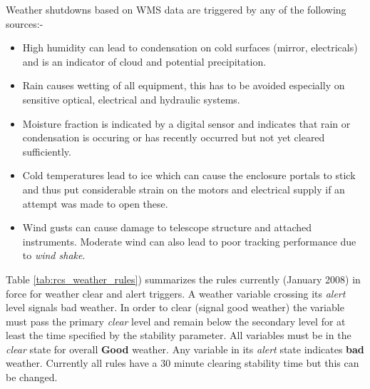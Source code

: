Weather shutdowns based on WMS data are triggered by any of the following sources:-
\begin{itemize}
\item High humidity can lead to condensation on cold surfaces (mirror, electricals) and is an indicator of cloud and potential precipitation.
\item Rain causes wetting of all equipment, this has to be avoided especially on sensitive optical, electrical and hydraulic systems.
\item Moisture fraction is indicated by a digital sensor and indicates that rain or condensation is occuring or has recently occurred but not yet cleared sufficiently.
\item Cold temperatures lead to ice which can cause the enclosure portals to stick and thus put considerable strain on the motors and electrical supply if an attempt was made to open these.
\item Wind gusts  can cause damage to telescope structure and attached instruments. Moderate wind can also lead to poor tracking performance due to \emph{wind shake}.
\end{itemize}

Table \ref{tab:rcs_weather_rules}) summarizes the rules currently (January 2008) in force for weather clear and alert triggers. A weather variable crossing its \emph{alert} level signals bad weather. In order to clear (signal good weather) the variable must pass the primary \emph{clear} level and remain below the secondary level for at least the time specified by the stability parameter. All variables must be in the \emph{clear} state for overall {\bf Good} weather. Any variable in its \emph{alert} state indicates {\bf bad} weather. Currently all rules have a 30 minute clearing stability time but this can be changed.


